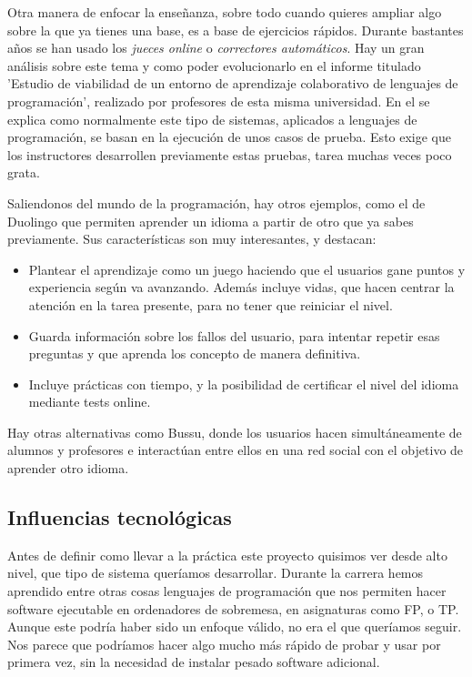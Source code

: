 Otra manera de enfocar la enseñanza, sobre todo cuando quieres ampliar algo sobre la que ya tienes una base, es a base de ejercicios rápidos. Durante bastantes años se han usado los \emph{jueces online} o \emph{correctores automáticos}. Hay un gran análisis sobre este tema y como poder evolucionarlo en el informe titulado 'Estudio de viabilidad de un entorno de aprendizaje colaborativo de lenguajes de programación'\cite{pimcdDuoCode14}, realizado por profesores de esta misma universidad. En el se explica como normalmente este tipo de sistemas, aplicados a lenguajes de programación, se basan en la ejecución de unos casos de prueba. Esto exige que los instructores desarrollen previamente estas pruebas, tarea muchas veces poco grata. 

Saliendonos del mundo de la programación, hay otros ejemplos, como el de Duolingo\cite{duolingo} que permiten aprender un idioma a partir de otro que ya sabes previamente. Sus características son muy interesantes, y destacan:

\begin{itemize}
\item
Plantear el aprendizaje como un juego haciendo que el usuarios gane puntos y experiencia según va avanzando. Además incluye vidas, que hacen centrar la atención en la tarea presente, para no tener que reiniciar el nivel.

\item
Guarda información sobre los fallos del usuario, para intentar repetir esas preguntas y que aprenda los concepto de manera definitiva.

\item
Incluye prácticas con tiempo, y la posibilidad de certificar el nivel del idioma mediante tests online.
\end{itemize}

Hay otras alternativas como Bussu\cite{bussu}, donde los usuarios hacen simultáneamente de alumnos y profesores e interactúan entre ellos en una red social con el objetivo de aprender otro idioma.

\subsection{Influencias tecnológicas\label{subsec:introduction}}

Antes de definir como llevar a la práctica este proyecto quisimos ver desde alto nivel, que tipo de sistema queríamos desarrollar. Durante la carrera hemos aprendido entre otras cosas lenguajes de programación que nos permiten hacer software ejecutable en ordenadores de sobremesa, en asignaturas como FP\cite{FP}, o TP\cite{TP}. Aunque este podría haber sido un enfoque válido, no era el que queríamos seguir. Nos parece que podríamos hacer algo mucho más rápido de probar y usar por primera vez, sin la necesidad de instalar pesado software adicional.

